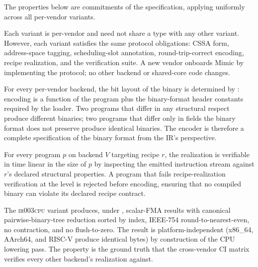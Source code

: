 The properties below are commitments of the  specification, applying uniformly across all per-vendor variants.

\begin{property}
\label{prop:ir003-protocol}
Each  variant is per-vendor and need not share a type with any other variant.
However, each variant satisfies the same protocol obligations: CSSA form, address-space tagging, scheduling-slot annotation, round-trip-correct encoding, recipe realization, and the verification suite.
A new vendor onboards Mimic by implementing the protocol; no other backend or shared-core code changes.
\end{property}

\begin{property}
\label{prop:ir003-faithful}
For every per-vendor backend, the bit layout of the binary is determined by : encoding is a function of the  program plus the binary-format header constants required by the loader.
Two  programs that differ in any structural respect produce different binaries; two  programs that differ only in fields the binary format does not preserve produce identical binaries.
The encoder is therefore a complete specification of the binary format from the IR's perspective.
\end{property}

\begin{property}
\label{prop:ir003-recipe-verifiable}
For every  program $p$ on backend $V$ targeting recipe $r$, the realization is verifiable in time linear in the size of $p$ by inspecting the emitted instruction stream against $r$'s declared structural properties.
A program that fails recipe-realization verification at the  level is rejected before encoding, ensuring that no compiled binary can violate its declared recipe contract.
\end{property}

\begin{property}
\label{prop:ir003-cpu-bitexact}
The \textsc{ir003cpu} variant produces, under , scalar-FMA results with canonical pairwise-binary-tree reduction sorted by index, IEEE-754 round-to-nearest-even, no contraction, and no flush-to-zero.
The result is platform-independent (x86\_64, AArch64, and RISC-V produce identical bytes) by construction of the CPU lowering pass.
The property is the ground truth that the cross-vendor CI matrix verifies every other backend's realization against.
\end{property}

